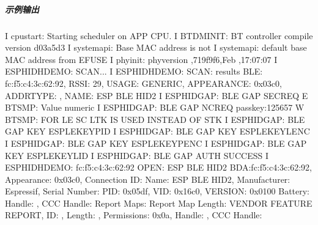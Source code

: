 \documentclass[a4paper,12pt,english]{sphinxmanual}
\begin{document}
{{\subparagraph{示例输出}
\label{\detokenize{exp-esp32/bluetooth/hid-gap:id5}}
\begin{sphinxVerbatim}[commandchars=\\\{\}]
I  cpu\PYGZus{}start: Starting scheduler on APP CPU.
I  BTDM\PYGZus{}INIT: BT controller compile version \PYG{o}{[}d03a5d3\PYG{o}{]}
I  system\PYGZus{}api: Base MAC address is not 
I  system\PYGZus{}api:  default base MAC address from EFUSE
I  phy\PYGZus{}init: phy\PYGZus{}version ,719f9f6,Feb  ,17:07:07
I  ESP\PYGZus{}HIDH\PYGZus{}DEMO: SCAN...
I  ESP\PYGZus{}HIDH\PYGZus{}DEMO: SCAN:  results
  BLE: fc:f5:c4:3c:62:92, RSSI: \PYGZhy{}29, USAGE: GENERIC, APPEARANCE: 0x03c0, ADDR\PYGZus{}TYPE: , NAME: ESP BLE HID2 
I  ESP\PYGZus{}HID\PYGZus{}GAP: BLE GAP SEC\PYGZus{}REQ
E  BT\PYGZus{}SMP: Value  numeric   
I  ESP\PYGZus{}HID\PYGZus{}GAP: BLE GAP NC\PYGZus{}REQ passkey:125657
W  BT\PYGZus{}SMP: FOR LE SC LTK IS USED INSTEAD OF STK
I  ESP\PYGZus{}HID\PYGZus{}GAP: BLE GAP KEY   ESP\PYGZus{}LE\PYGZus{}KEY\PYGZus{}PID
I  ESP\PYGZus{}HID\PYGZus{}GAP: BLE GAP KEY   ESP\PYGZus{}LE\PYGZus{}KEY\PYGZus{}LENC
I  ESP\PYGZus{}HID\PYGZus{}GAP: BLE GAP KEY   ESP\PYGZus{}LE\PYGZus{}KEY\PYGZus{}PENC
I  ESP\PYGZus{}HID\PYGZus{}GAP: BLE GAP KEY   ESP\PYGZus{}LE\PYGZus{}KEY\PYGZus{}LID
I  ESP\PYGZus{}HID\PYGZus{}GAP: BLE GAP AUTH SUCCESS
I  ESP\PYGZus{}HIDH\PYGZus{}DEMO: fc:f5:c4:3c:62:92 OPEN: ESP BLE HID2
BDA:fc:f5:c4:3c:62:92, Appearance: 0x03c0, Connection ID: 
Name: ESP BLE HID2, Manufacturer: Espressif, Serial Number: 
PID: 0x05df, VID: 0x16c0, VERSION: 0x0100
Battery: Handle: , CCC Handle: 
Report Maps: 
  Report Map Length: 
      VENDOR FEATURE REPORT, ID:  , Length:   , Permissions: 0x0a, Handle:  , CCC Handle:   

\end{sphinxVerbatim}}}
\end{document}
